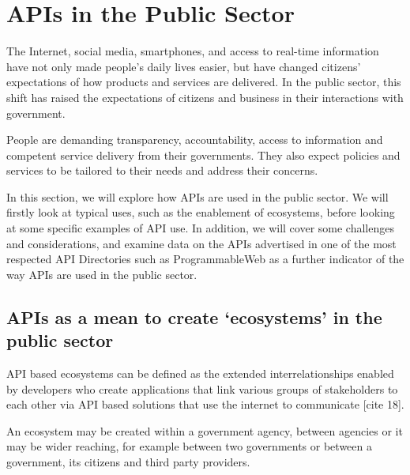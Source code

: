 
\chapter{APIs in the Public Sector}

\ifpdf
    \graphicspath{{Chapter2/Figs/Raster/}{Chapter2/Figs/PDF/}{Chapter2/Figs/}}
\else
    \graphicspath{{Chapter2/Figs/Vector/}{Chapter2/Figs/}}
\fi

The Internet, social media, smartphones, and access to real-time information
have not only made people’s daily lives easier, but have changed citizens’
expectations of how products and services are delivered. In the public sector,
this shift has raised the expectations of citizens and business in their
interactions with government.

People are demanding transparency, accountability, access to information and
competent service delivery from their governments. They also expect policies
and services to be tailored to their needs and address their concerns.

In this section, we will explore how APIs are used in the public sector.
We will firstly look at typical uses, such as the enablement of ecosystems,
before looking at some specific examples of API use. In addition, we will
cover some challenges and considerations, and examine data on the APIs
advertised in one of the most respected API Directories such as
ProgrammableWeb as a further indicator of the way APIs are used in the
public sector.


\section{APIs as a mean to create ‘ecosystems’ in the public sector}

API based ecosystems can be defined as the extended interrelationships enabled
by developers who create applications that link various groups of stakeholders
to each other via API based solutions that use the internet to communicate [cite 18].

An ecosystem may be created within a government agency, between agencies or
it may be wider reaching, for example between two governments or between a government,
its citizens and third party providers.


